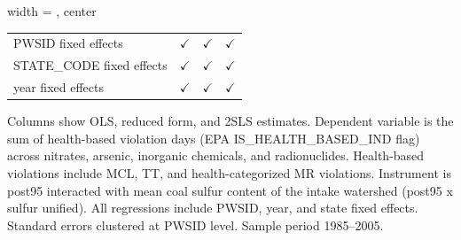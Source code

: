 \begin{table}[htbp]
\begin{adjustbox}{width = \textwidth, center}
\begin{tabular}{lccc}
         PWSID fixed effects                               & $\checkmark$          & $\checkmark$  & $\checkmark$\\   
         STATE\_CODE fixed effects                         & $\checkmark$          & $\checkmark$  & $\checkmark$\\   
         year fixed effects                                & $\checkmark$          & $\checkmark$  & $\checkmark$\\   
         
         \bottomrule
         
      \end{tabular}
      
      
      
   \end{adjustbox}
      {\tiny\linespread{1}\selectfont \par \raggedright 
   Columns show OLS, reduced form, and 2SLS estimates. Dependent variable is the sum of health-based violation days (EPA IS\_HEALTH\_BASED\_IND flag) across nitrates, arsenic, inorganic chemicals, and radionuclides. Health-based violations include MCL, TT, and health-categorized MR violations. Instrument is post95 interacted with mean coal sulfur content of the intake watershed (post95 x sulfur unified). All regressions include PWSID, year, and state fixed effects. Standard errors clustered at PWSID level. Sample period 1985--2005.}
   
\end{table}


